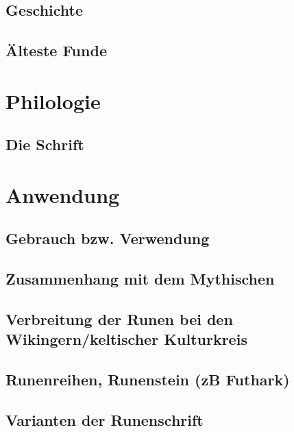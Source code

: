 \documentclass[a4paper]{scrartcl}
\begin{document}
\subsection{Geschichte}
\subsection{Älteste Funde}
\section{Philologie}
\subsection{Die Schrift}


\section{Anwendung}
\subsection{Gebrauch bzw. Verwendung}
\subsection{Zusammenhang mit dem Mythischen}
\subsection{Verbreitung der Runen bei den Wikingern/keltischer Kulturkreis}
\subsection{Runenreihen, Runenstein (zB Futhark)}
\subsection{Varianten der Runenschrift}
\end{document}
